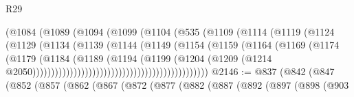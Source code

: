\begin{lexlean}{R29}
\begin{coremodule}
                                          (@1084
                                            (@1089
                                              (@1094
                                                (@1099
                                                  (@1104
                                                    (@535
                                                      (@1109
                                                        (@1114
                                                          (@1119
                                                            (@1124
                                                              (@1129
                                                                (@1134
                                                                  (@1139
                                                                    (@1144
                                                                      (@1149
                                                                        (@1154
                                                                          (@1159
                                                                            (@1164
                                                                              (@1169
                                                                                (@1174
                                                                                  (@1179
                                                                                    (@1184
                                                                                      (@1189
                                                                                        (@1194
                                                                                          (@1199
                                                                                            (@1204
                                                                                              (@1209
                                                                                                (@1214
                                                                                                  @2050)))))))))))))))))))))))))))))))))))))))))))))))
@2146 := @837
    (@842
      (@847
        (@852
          (@857
            (@862
              (@867
                (@872
                  (@877
                    (@882
                      (@887
                        (@892
                          (@897
                            (@898
                              (@903

\end{coremodule}
\end{lexlean}
